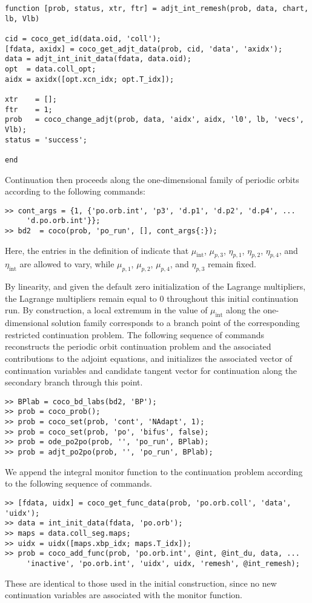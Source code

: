 \begin{lstlisting}[language=coco-highlight]
function [prob, status, xtr, ftr] = adjt_int_remesh(prob, data, chart, lb, Vlb)

cid = coco_get_id(data.oid, 'coll');
[fdata, axidx] = coco_get_adjt_data(prob, cid, 'data', 'axidx');
data = adjt_int_init_data(fdata, data.oid);
opt  = data.coll_opt;
aidx = axidx([opt.xcn_idx; opt.T_idx]);

xtr    = [];
ftr    = 1;
prob   = coco_change_adjt(prob, data, 'aidx', aidx, 'l0', lb, 'vecs', Vlb);
status = 'success';

end
\end{lstlisting}
Continuation then proceeds along the one-dimensional family of periodic orbits according to the following commands:
\begin{lstlisting}[language=coco-highlight]
>> cont_args = {1, {'po.orb.int', 'p3', 'd.p1', 'd.p2', 'd.p4', ...
     'd.po.orb.int'}};
>> bd2  = coco(prob, 'po_run', [], cont_args{:});
\end{lstlisting}
Here, the entries in the definition of  indicate that $\mu_\mathrm{int}$, $\mu_{p,3}$, $\eta_{p,1}$, $\eta_{p,2}$, $\eta_{p,4}$, and $\eta_\mathrm{int}$ are allowed to vary, while $\mu_{p,1}$, $\mu_{p,2}$, $\mu_{p,4}$, and $\eta_{p,3}$ remain fixed.

By linearity, and given the default zero initialization of the Lagrange multipliers, the Lagrange multipliers remain equal to $0$ throughout this initial continuation run. By construction, a local extremum in the value of $\mu_\mathrm{int}$ along the one-dimensional solution family corresponds to a branch point of the corresponding restricted continuation problem. The following sequence of commands reconstructs the periodic orbit continuation problem and the associated contributions to the adjoint equations, and initializes the associated vector of continuation variables and candidate tangent vector for continuation along the secondary branch through this point.
\begin{lstlisting}[language=coco-highlight]
>> BPlab = coco_bd_labs(bd2, 'BP');
>> prob = coco_prob();
>> prob = coco_set(prob, 'cont', 'NAdapt', 1);
>> prob = coco_set(prob, 'po', 'bifus', false);
>> prob = ode_po2po(prob, '', 'po_run', BPlab);
>> prob = adjt_po2po(prob, '', 'po_run', BPlab);
\end{lstlisting}
We append the integral monitor function to the continuation problem according to the following sequence of commands.
\begin{lstlisting}[language=coco-highlight]
>> [fdata, uidx] = coco_get_func_data(prob, 'po.orb.coll', 'data', 'uidx');
>> data = int_init_data(fdata, 'po.orb');
>> maps = data.coll_seg.maps;
>> uidx = uidx([maps.xbp_idx; maps.T_idx]);
>> prob = coco_add_func(prob, 'po.orb.int', @int, @int_du, data, ...
     'inactive', 'po.orb.int', 'uidx', uidx, 'remesh', @int_remesh);
\end{lstlisting}
These are identical to those used in the initial construction, since no new continuation variables are associated with the monitor function. 

